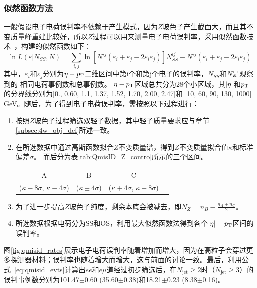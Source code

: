 \subsubsection{似然函数方法}
一般假设电子电荷误判率不依赖于产生模式，因为$Z$玻色子产生截面大，而且其不变质量峰重建比较好，所以$Z$过程可以用来测量电子电荷误判率，采用似然函数技术~\cite{Likelihoodnote}，构建的似然函数如下：
\begin{equation}
\ln L(\varepsilon|N_{SS},N)=\sum_{i,j}\ln [N^{ij}(\varepsilon_i+\varepsilon_j-2\varepsilon_i \varepsilon_j)]N^{ij}_{SS}-N^{ij}(\varepsilon_i+\varepsilon_j-2\varepsilon_i \varepsilon_j)
\end{equation}
其中，$\varepsilon_i$和$\varepsilon_j$分别为$\eta-p_{\text{T}}$二维区间中第i个和第j个电子的误判率，$N_{SS}$和$N$是观察到的
相同电荷事例数和总事例数。
$\eta-p_{\text{T}}$区域总共分为28个小区域，其$|\eta|$和$p_{\text{T}}$的分界线分别为[0., 0.60, 1.1, 1.37, 1.52, 1.70, 2.00, 2.47]和
[10, 60, 90, 130, 1000] GeV。随后，为了得到电子电荷误判率，需按照以下过程进行：
\begin{enumerate}
 \item 按照$Z$玻色子过程筛选双轻子数据，其中轻子质量要求应与章节\ref{subsec:4w_obj_def}所述一致。
 \item 在所选数据中通过高斯函数拟合$Z$不变质量谱，得到$Z$不变质量拟合值$\kappa$和标准偏差$\sigma$。
而后分为表\ref{tab:QmisID_Z_contro}所示的三个区间。
\begin{table}[h]
\centering
\begin{tabular}{cccc}
\hline
  A  &B  &C  \\
($\kappa-8\sigma$, $\kappa - 4\sigma$)  & ($\kappa \pm 4\sigma$)  & ($\kappa+4\sigma$, $\kappa + 8\sigma$) \\
\hline
\end{tabular}
\label{tab:QmisID_Z_control}
\end{table}

 \item 为了进一步提高$Z$玻色子纯度，剩余本底会被减去，即$N_Z=n_B-\frac{n_A+n_C}{2}$。
 \item 所选数据根据电荷分为SS和OS，利用最大似然函数法得到各个$|\eta|-p_{\text{T}}$区间的误判率。
\end{enumerate}
图\ref{fig:qmisid_rates}展示电子电荷误判率随着\abseta 增加而增大，因为在高\abseta 粒子会穿过更多探测器材料；误判率也随着\pt 增大而增大，这与前面的讨论一致。最后，利用公式~\ref{eq:qmisid_evts}计算出$ee$和$e\mu$道经过初步筛选后，在$N_{\text{jet}}\ge2$时（$N_{\text{jet}}\ge3$）的误判事例数分别为101.47$\pm$0.60 (35.60$\pm$0.38)和18.21$\pm$0.23 (8.38$\pm$0.16)。
